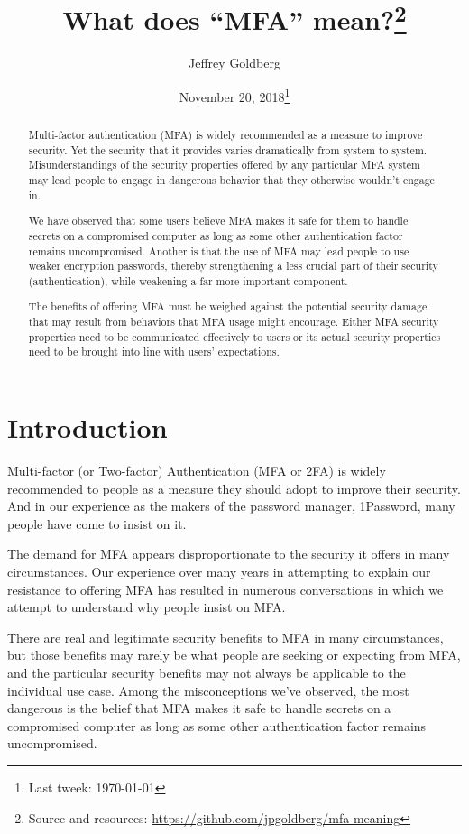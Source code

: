 \documentclass[12pt]{article}
\title{What does ``MFA'' mean?\thanks{Source and resources: \protect\url{https://github.com/jpgoldberg/mfa-meaning}}}
\date{November 20, 2018\thanks{Last tweek: \today }}
\author{Jeffrey Goldberg}
\affil{1Password\\ jeff@1Password.com}
\begin{document}
\maketitle

\begin{abstract}
  Multi-factor authentication (MFA) is widely recommended as a measure to improve security. Yet the security that it provides varies dramatically from system to system.
  Misunderstandings of the security properties offered by any particular MFA system may lead people to engage in dangerous behavior that they otherwise wouldn't engage in.

  We have observed that some users believe MFA makes it safe for them to handle secrets on a compromised computer as long as some other authentication factor remains uncompromised.
  Another is that the use of MFA may lead people to use weaker encryption passwords,
  thereby strengthening a less crucial part of their security (authentication), while weakening a far more important component.

  The benefits of offering MFA must be weighed against the potential security damage that may result from behaviors that MFA usage might encourage.
  Either MFA security properties need to be communicated effectively to users or its actual security properties need to be brought into line with users' expectations. 
\end{abstract}


\section{Introduction}
Multi-factor (or Two-factor) Authentication (MFA or 2FA) is widely recommended to people as a measure they should adopt to improve their security. And in our experience as the makers of the password manager, 1Password, many people have come to insist on it.

The demand for MFA appears disproportionate to the security it offers in many circumstances. Our experience over many years in attempting to explain our resistance to offering MFA has resulted in numerous conversations in which we attempt to understand why people insist on MFA\@.

There are real and legitimate security benefits to MFA in many circumstances, but those benefits may rarely be what people are seeking or expecting from MFA, and the particular security benefits may not always be applicable to the individual use case.
Among the misconceptions we've observed, the most dangerous is the belief that
MFA makes it safe to handle secrets on a compromised computer as long as some other authentication factor remains uncompromised.
\end{document}
